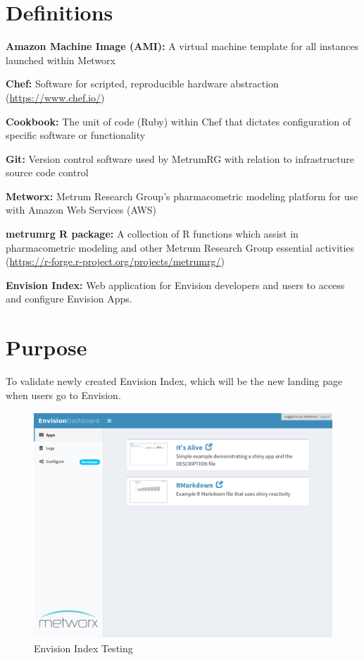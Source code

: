 \documentclass[]{article}
\begin{document}
\newpage



\section{Definitions}\label{definitions}

\textbf{Amazon Machine Image (AMI):} A virtual machine template for all
instances launched within Metworx

\textbf{Chef:} Software for scripted, reproducible hardware abstraction
(\url{https://www.chef.io/})

\textbf{Cookbook:} The unit of code (Ruby) within Chef that dictates
configuration of specific software or functionality

\textbf{Git:} Version control software used by MetrumRG with relation to
infrastructure source code control

\textbf{Metworx:} Metrum Research Group's pharmacometric modeling
platform for use with Amazon Web Services (AWS)

\textbf{metrumrg R package:} A collection of R functions which assist in
pharmacometric modeling and other Metrum Research Group essential
activities (\url{https://r-forge.r-project.org/projects/metrumrg/})

\textbf{Envision Index:} Web application for Envision developers and
users to access and configure Envision Apps.

\section{Purpose}\label{purpose}

To validate newly created Envision Index, which will be the new landing
page when users go to Envision. \vspace{1cm}

\begin{figure}
\includegraphics[width=428px,height=321px]{Envision-Index-Testing-1_files/figure-latex/unnamed-chunk-2-1} \caption{Envision Index Testing}\label{fig:unnamed-chunk-2}
\end{figure}
\end{document}
